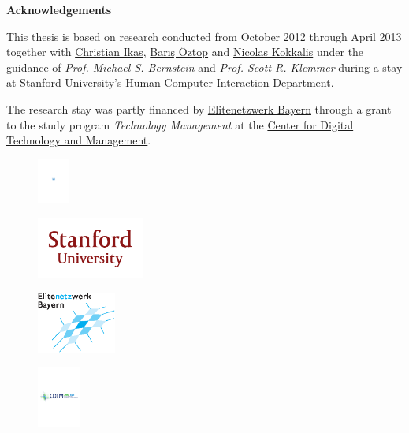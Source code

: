 \clearemptydoublepage
{}
{}



\vspace*{0cm}

\begin{center}
{\Large \bf Acknowledgements}
\end{center}

\vspace{1cm}

This thesis is based on research conducted from October 2012 through April 2013 together with \href{mailto:ikas@in.tum.de}{Christian Ikas}, \href{mailto:boztop@gmail.com}{Barış Öztop} and \href{mailto:nicolas@cs.stanford.edu}{Nicolas Kokkalis} under the guidance of \emph{Prof. Michael S. Bernstein} and \emph{Prof. Scott R. Klemmer} during a stay at Stanford University's \href{http://hci.stanford.edu}{Human Computer Interaction Department}.

The research stay was partly financed by \href{https://www.elitenetzwerk.bayern.de}{Elitenetzwerk Bayern} through a grant to the study program \emph{Technology Management} at the \href{http://www.cdtm.de}{Center for Digital Technology and Management}.

\vspace{1cm}

\begin{figure}[h!]
\centering
\includegraphics[height=1.5cm]{styles/tum_logo.pdf}
\end{figure}

\vspace{0.5cm}

\begin{figure}[h!]
\centering
\includegraphics[height=2cm]{styles/stanford_logo.png}
\end{figure}

\vspace{0.5cm}

\begin{figure}[h!]
\centering
\includegraphics[height=2cm]{styles/enb_logo.eps}
\end{figure}

\vspace{0.5cm}

\begin{figure}[h!]
\centering
\includegraphics[height=2cm]{styles/cdtm_logo.pdf}
\end{figure}